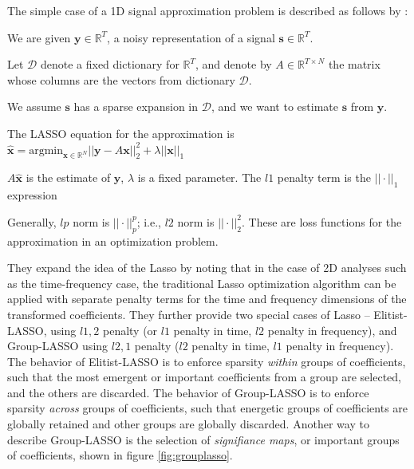 \documentclass[letter,12pt]{article}
\newenvironment{tight_itemize}{
\begin{itemize}
  \setlength{\itemsep}{0pt}
  \setlength{\parskip}{0pt}
}{\end{itemize}}
\begin{document}
The simple case of a 1D signal approximation problem is described as follows by \citet{sparsitykowalski, sparsitykowalski2}:
\begin{tight_itemize}
	\item
		We are given $\mathbf{y} \in \mathbb{R}^{T}$, a noisy representation of a signal $\mathbf{s} \in \mathbb{R}^{T}$.
	\item
		Let $\mathcal{D}$ denote a fixed dictionary for $\mathbb{R}^{T}$, and denote by $\mathit{A} \in \mathbb{R}^{T \times N}$ the matrix whose columns are the vectors from dictionary $\mathcal{D}$.
	\item
		We assume $\mathbf{s}$ has a sparse expansion in $\mathcal{D}$, and we want to estimate $\mathbf{s}$ from $\mathbf{y}$.
	\item
		The LASSO equation for the approximation is $\mathbf{\hat{x}} = \text{argmin}_{\mathbf{x} \in \mathbb{R}^{N}} ||\mathbf{y} - \mathit{A}\mathbf{x}||_{2}^{2} + \lambda ||\mathbf{x}||_{1}$
	\item
		$A\mathbf{\hat{x}}$ is the estimate of $\mathbf{y}$, $\lambda$ is a fixed parameter. The $l1$ penalty term is the $|| \cdot ||_{1}$ expression
	\item
		Generally, $lp$ norm is $|| \cdot ||_{p}^{p}$; i.e., $l2$ norm is $|| \cdot ||_{2}^{2}$. These are loss functions for the approximation in an optimization problem.
\end{tight_itemize}

They expand the idea of the Lasso by noting that in the case of 2D analyses such as the time-frequency case, the traditional Lasso optimization algorithm can be applied with separate penalty terms for the time and frequency dimensions of the transformed coefficients. They further provide two special cases of Lasso -- Elitist-LASSO, using $l1,2$ penalty (or $l1$ penalty in time, $l2$ penalty in frequency), and Group-LASSO using $l2,1$ penalty ($l2$ penalty in time, $l1$ penalty in frequency). The behavior of Elitist-LASSO is to enforce sparsity \textit{within} groups of coefficients, such that the most emergent or important coefficients from a group are selected, and the others are discarded. The behavior of Group-LASSO is to enforce sparsity \textit{across} groups of coefficients, such that energetic groups of coefficients are globally retained and other groups are globally discarded. Another way to describe Group-LASSO is the selection of \textit{signifiance maps}, or important groups of coefficients, shown in figure \ref{fig:grouplasso}.
\end{document}
